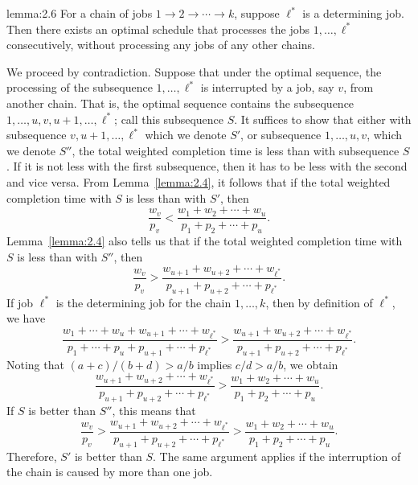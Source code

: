 \begin{lemma}{lemma:2.6}
    For a chain of jobs $1 \to 2 \to \cdots \to k$, suppose $\ell^*$ is 
    a determining job. Then there exists an optimal schedule that processes 
    the jobs $1, \dots, \ell^*$ consecutively, without processing any jobs 
    of any other chains. 
\end{lemma}
\begin{pf}
    We proceed by contradiction. Suppose that under the optimal sequence, 
    the processing of the subsequence $1, \dots, \ell^*$ is interrupted by a 
    job, say $v$, from another chain. That is, the optimal sequence 
    contains the subsequence $1, \dots, u, v, u+1, \dots, \ell^*$; call 
    this subsequence $S$. It suffices to show that either with subsequence 
    $v, u+1, \dots, \ell^*$ which we denote $S'$, or subsequence 
    $1, \dots, u, v$, which we denote $S''$, the total weighted completion 
    time is less than with subsequence $S$. If it is not less with the
    first subsequence, then it has to be less with the second and vice versa.
    From Lemma~\ref{lemma:2.4}, it follows that if the total weighted 
    completion time with $S$ is less than with $S'$, then
    \[ \frac{w_v}{p_v} < \frac{w_1 + w_2 + \cdots + w_u}{p_1 + p_2 + \cdots 
    + p_u}. \] 
    Lemma~\ref{lemma:2.4} also tells us that if the total weighted completion 
    time with $S$ is less than with $S''$, then
    \[ \frac{w_v}{p_v} > \frac{w_{u+1} + w_{u+2} + \cdots + w_{\ell^*}}
    {p_{u+1} + p_{u+2} + \cdots + p_{\ell^*}}. \] 
    If job $\ell^*$ is the determining job for the chain $1, \dots, k$, then 
    by definition of $\ell^*$, we have 
    \[ \frac{w_1 + \cdots + w_u + w_{u+1} + \cdots + w_{\ell^*}}{p_1 
    + \cdots + p_u + p_{u+1} + \cdots + p_{\ell^*}} > 
    \frac{w_{u+1} + w_{u+2} + \cdots + w_{\ell^*}}
    {p_{u+1} + p_{u+2} + \cdots + p_{\ell^*}}. \] 
    Noting that $(a+c)/(b+d) > a/b$ implies $c/d > a/b$, we obtain 
    \[ \frac{w_{u+1} + w_{u+2} + \cdots + w_{\ell^*}}
    {p_{u+1} + p_{u+2} + \cdots + p_{\ell^*}} > \frac{w_1 + w_2 + \cdots + w_u}
    {p_1 + p_2 + \cdots + p_u}. \] 
    If $S$ is better than $S''$, this means that 
    \[ \frac{w_v}{p_v} > \frac{w_{u+1} + w_{u+2} + \cdots + w_{\ell^*}}
    {p_{u+1} + p_{u+2} + \cdots + p_{\ell^*}} > \frac{w_1 + w_2 + \cdots + w_u}
    {p_1 + p_2 + \cdots + p_u}. \] 
    Therefore, $S'$ is better than $S$. The same argument applies if the 
    interruption of the chain is caused by more than one job. 
\end{pf}


